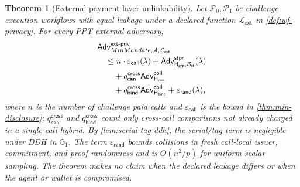 \documentclass[letterpaper]{article}
\newcommand{\system}{MinMandate\xspace}
\newcommand{\trace}{\mathcal{P}}
\newcommand{\adv}{\mathcal{A}}
\newcommand{\hash}{\mathsf{H}_{\mathsf{can}}}
\newcommand{\hashBind}{\mathsf{H}_{\mathsf{bind}}}
\newcommand{\hashG}{\mathsf{H}_{\mathsf{grp}}}
\newcommand{\Adv}{\mathsf{Adv}}
\newtheorem{theorem}{Theorem}
\begin{document}
\begingroup\sloppy
\begin{theorem}[External-payment-layer unlinkability]
\label{thm:wf-privacy}
Let \(\trace_0,\trace_1\) be challenge execution workflows with equal leakage under a
declared function \(\mathcal L_{\mathsf{ext}}\) in
\cref{def:wf-privacy}. For every PPT external adversary,
\begin{equation}
\ifdefined\MMAAAITwoColumn
\begin{aligned}
&\mathsf{Adv}^{\mathsf{ext\text{-}priv}}_{\system,\adv,
  \mathcal L_{\mathsf{ext}}}\\
&\quad\le n\cdot\varepsilon_{\mathsf{call}}(\lambda)
  +\Adv^{\mathsf{stpr}}_{\hashG,\mathcal B_{\mathsf{st}}}(\lambda)\\
&\qquad
  +q_{\mathsf{can}}^{\mathsf{cross}}\mathsf{Adv}^{\mathsf{coll}}_{\hash}\\
&\qquad
  +q_{\mathsf{bind}}^{\mathsf{cross}}\mathsf{Adv}^{\mathsf{coll}}_{\hashBind}
  +\varepsilon_{\mathsf{rand}}(\lambda),
\end{aligned}
\else
  \mathsf{Adv}^{\mathsf{ext\text{-}priv}}_{\system,\adv,
  \mathcal L_{\mathsf{ext}}}
  \le
  n\cdot\varepsilon_{\mathsf{call}}(\lambda)
  +\Adv^{\mathsf{stpr}}_{\hashG,\mathcal B_{\mathsf{st}}}(\lambda)
  +q_{\mathsf{can}}^{\mathsf{cross}}\mathsf{Adv}^{\mathsf{coll}}_{\hash}
  +q_{\mathsf{bind}}^{\mathsf{cross}}\mathsf{Adv}^{\mathsf{coll}}_{\hashBind}
  +\varepsilon_{\mathsf{rand}}(\lambda),
\fi
\end{equation}
where \(n\) is the number of challenge paid calls and
\(\varepsilon_{\mathsf{call}}\) is the bound in
\cref{thm:min-disclosure}; \(q_{\mathsf{can}}^{\mathsf{cross}}\) and
\(q_{\mathsf{bind}}^{\mathsf{cross}}\) count only cross-call comparisons not
already charged in a single-call hybrid. By
\cref{lem:serial-tag-ddh}, the serial/tag term is negligible under DDH in
\(\mathbb G_1\). The term \(\varepsilon_{\mathsf{rand}}\) bounds collisions in
fresh call-local issuer, commitment, and proof randomness and is
\(O(n^2/p)\) for uniform scalar sampling. The theorem makes no claim when the
declared leakage differs or when the agent or wallet is compromised.
\end{theorem}
\end{document}
